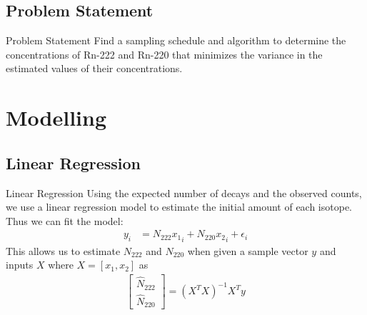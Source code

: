 \documentclass{beamer}
\begin{document}
\subsection{Problem Statement}
\begin{frame}{Problem Statement}
    Find a sampling schedule and algorithm to determine the concentrations of Rn-222 and Rn-220 that minimizes the variance in the estimated values of their concentrations.
\end{frame}
\section{Modelling}
\subsection{Linear Regression}
\begin{frame}{Linear Regression}
    Using the expected number of decays and the observed counts, we use a linear regression model to estimate the initial amount of each isotope. Thus we can fit the model:
    \begin{align*}
        y_i &= N_{222} {x_1}_i + N_{220} {x_2}_i + {\epsilon}_i
    \end{align*}
This allows us to estimate $N_{222}$ and $N_{220}$ when given a sample vector $y$ and inputs $X$ where $X=[{x}_1, {x}_2]$ as
\begin{align*}
    \begin{bmatrix}
    \hat{N}_{222}\\
    \hat{N}_{220}
    \end{bmatrix} = (X^TX)^{-1}X^T y
\end{align*}
\end{frame}
\end{document}
